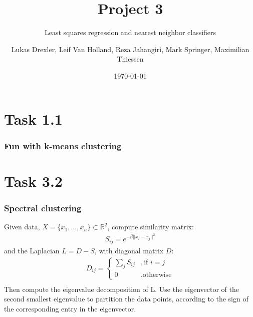 \documentclass{beamer}
\title[Project 3]{Project 3}
\subtitle{Least squares regression and nearest neighbor classifiers}
\author{Lukas Drexler, Leif Van Holland, Reza Jahangiri, Mark Springer, Maximilian Thiessen}
\institute[Universität Bonn]{Rheinische Friedrich-Wilhelms-Universität}
\date{\today}
\begin{document}
	
\begin{frame}%
	\titlepage
\end{frame}



\section{Task 1.1}

\begin{frame}
\frametitle{Fun with k-means clustering}

\end{frame}


\section{Task 3.2}
\begin{frame}
	\frametitle{Spectral clustering}
	Given data, $X = \{x_1,\ldots,x_n\} \subset \mathbb{R}^2$, compute similarity matrix:
	\begin{align*}
		S_{ij} = e^{-\beta ||x_i-x_j||^2}
	\end{align*}
	and the Laplacian $L = D-S$, with diagonal matrix $D$:
	\begin{align*}
	D_{ij} = \begin{cases}
	\sum_j S_{ij} & ,\text{if } i=j\\
	0 &, \text{otherwise}
	\end{cases}\\
	\end{align*}
	Then compute the eigenvalue decomposition of L. Use the eigenvector of the second smallest eigenvalue to partition the data points, according to the sign of the corresponding entry in the eigenvector.
\end{frame}
\end{document}
